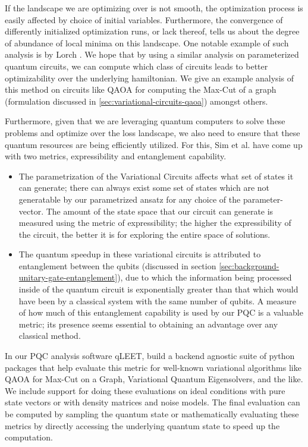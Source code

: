 If the landscape we are optimizing over is not smooth, the optimization process is easily affected by choice of initial variables. Furthermore, the convergence of differently initialized optimization runs, or lack thereof, tells us about the degree of abundance of local minima on this landscape. One notable example of such analysis is by Lorch \cite{training-trajectories}. We hope that by using a similar analysis on parameterized quantum circuits, we can compute which class of circuits leads to better optimizability over the underlying hamiltonian. We give an example analysis of this method on circuits like QAOA for computing the Max-Cut of a graph (formulation discussed in \ref{sec:variational-circuits-qaoa}) amongst others.

Furthermore, given that we are leveraging quantum computers to solve these problems and optimize over the loss landscape, we also need to ensure that these quantum resources are being efficiently utilized. For this, Sim et al. \cite{expressibility-entanglability-guzik} have come up with two metrics, expressibility and entanglement capability. 
\begin{itemize}
    \item The parametrization of the Variational Circuits affects what set of states it can generate; there can always exist some set of states which are not generatable by our parametrized ansatz for any choice of the parameter-vector. The amount of the state space that our circuit can generate is measured using the metric of expressibility; the higher the expressibility of the circuit, the better it is for exploring the entire space of solutions.  
    \item The quantum speedup in these variational circuits is attributed to entanglement between the qubits (discussed in section \ref{sec:background-unitary-gate-entanglement}), due to which the information being processed inside of the quantum circuit is exponentially greater than that which would have been by a classical system with the same number of qubits. A measure of how much of this entanglement capability is used by our PQC is a valuable metric; its presence seems essential to obtaining an advantage over any classical method.
\end{itemize}

In our PQC analysis software qLEET, build a backend agnostic suite of python packages that help evaluate this metric for well-known variational algorithms like QAOA for Max-Cut on a Graph, Variational Quantum Eigensolvers, and the like. We include support for doing these evaluations on ideal conditions with pure state vectors or with density matrices and noise models. The final evaluation can be computed by sampling the quantum state or mathematically evaluating these metrics by directly accessing the underlying quantum state to speed up the computation.

